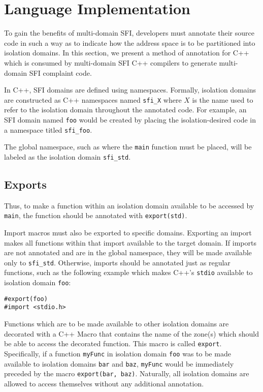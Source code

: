 \documentclass[12pt]{IEEEtran}
\begin{document}
\section{Language Implementation}

To gain the benefits of multi-domain SFI, developers must annotate their source code in such a way as to indicate how the address space is to be partitioned into isolation domains. In this section, we present a method of annotation for C++ which is consumed by multi-domain SFI C++ compilers to generate multi-domain SFI complaint code.

In C++, SFI domains are defined using namespaces. Formally, isolation domains are constructed as C++ namespaces named \texttt{sfi\_X} where $X$ is the name used to refer to the isolation domain throughout the annotated code. For example, an SFI domain named \texttt{foo} would be created by placing the isolation-desired code in a namespace titled \texttt{sfi\_foo}.

The global namespace, such as where the \texttt{main} function must be placed, will be labeled as the isolation domain \texttt{sfi\_std}.

\subsection{Exports} \label{exports}

Thus, to make a function within an isolation domain available to be accessed by \texttt{main}, the function should be annotated with \texttt{export(std)}.

Import macros must also be exported to specific domains. Exporting an import makes all functions within that import available to the target domain. If imports are not annotated and are in the global namespace, they will be made available only to \texttt{sfi\_std}. Otherwise, imports should be annotated just as regular functions, such as the following example which makes C++'s \texttt{stdio} available to isolation domain \texttt{foo}:
\begin{verbatim}
#export(foo)
#import <stdio.h>
\end{verbatim}

Functions which are to be made available to other isolation domains are decorated with a C++ Macro that contains the name of the zone(s) which should be able to access the decorated function. This macro is called \texttt{export}. Specifically, if a function \texttt{myFunc} in isolation domain \texttt{foo} was to be made available to isolation domains \texttt{bar} and \texttt{baz}, \texttt{myFunc} would be immediately preceded by the macro \texttt{export(bar, baz)}. Naturally, all isolation domains are allowed to access themselves without any additional annotation.
\end{document}
